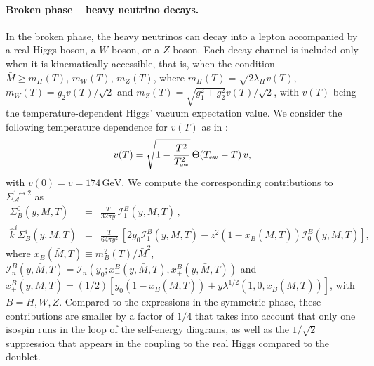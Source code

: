 \documentclass[12pt, a4paper]{article}
\def\Mav{\bar{M}}
\begin{document}
\paragraph{Broken phase -- heavy neutrino decays.} In the broken phase, the heavy neutrinos can decay into a lepton accompanied by a real Higgs boson, a $W$-boson, or a $Z$-boson. Each decay channel is included only when it is kinematically accessible, that is, when the condition $\Mav \geq m_H(T),\,m_W(T),\,m_Z(T)$, where $m_H(T) = \sqrt{2\lambda_H} v(T)$, $m_W(T) = g_2 v(T)/\sqrt{2}$ and $m_Z(T) = \sqrt{g_1^2 + g_2^2} v(T)/\sqrt{2}$, with $v(T)$ being the temperature-dependent Higgs' vacuum expectation value. We consider the following temperature dependence for $v(T)$ as  in \cite{Hambye:2016sby}:
\begin{equation}
 v(T) = \sqrt{1 - \frac{T^2}{T_{\rm ew}^2}} \,\Theta(T_{\rm ew}-T)\, v,
\end{equation}
with $v(0) = v = 174\,\text{GeV}$. We compute the corresponding contributions to $\Sigma_\mathcal{A}^{1 \leftrightarrow 2}$ as
\begin{eqnarray}
 \Sigma_B^0(y, \Mav, T) &=& \frac{T}{32\pi y}\,\mathcal{I}^B_1(y, \Mav, T)\,,\\
 \hat{k}^i\Sigma_B^i(y, \Mav, T) &=& \frac{T}{64\pi y^2}\,\left[2y_0 \mathcal{I}^B_1(y, \Mav, T) - z^2 \left(1 -x_B(\Mav, T)\right) \mathcal{I}^B_0(y, \Mav, T)\right],
\end{eqnarray}
 where $x_B( \Mav, T) \equiv m_B^2(T)/\Mav^2$, $\mathcal{I}^B_n(y, \Mav, T) = \mathcal{I}_n(y_0; x^B_-(y, \Mav, T), x^B_+(y, \Mav, T))$ and 
$x^B_{\pm}(y, \Mav, T) = (1/2)[y_0(1-x_B( \Mav, T)) \pm y \lambda^{1/2}(1, 0, x_B( \Mav, T))]$, with $B = H, W, Z$. Compared to the expressions in the symmetric phase, these contributions are smaller by a factor of $1/4$ that takes into account that only one
isospin runs in the loop of the self-energy diagrams, as well as the $1/\sqrt{2}$ suppression that appears in the coupling to the real Higgs compared to the doublet.
\end{document}
